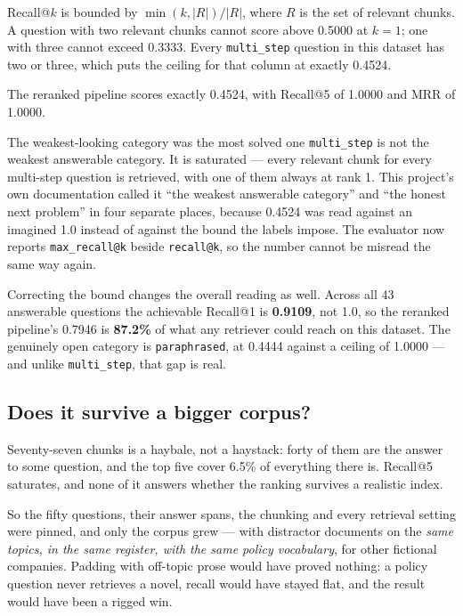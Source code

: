 \documentclass[11pt,a4paper]{article}
\newcommand{\code}[1]{\texttt{\small #1}}
\begin{document}
Recall@$k$ is bounded by $\min(k, |R|) / |R|$, where $R$ is the set of relevant
chunks. A question with two relevant chunks cannot score above 0.5000 at $k=1$;
one with three cannot exceed 0.3333. Every \code{multi\_step} question in this
dataset has two or three, which puts the ceiling for that column at exactly
0.4524.

The reranked pipeline scores exactly 0.4524, with Recall@5 of 1.0000 and MRR of
1.0000.

\begin{finding}{The weakest-looking category was the most solved one}
\code{multi\_step} is not the weakest answerable category. It is saturated ---
every relevant chunk for every multi-step question is retrieved, with one of them
always at rank 1. This project's own documentation called it ``the weakest
answerable category'' and ``the honest next problem'' in four separate places,
because 0.4524 was read against an imagined 1.0 instead of against the bound the
labels impose. The evaluator now reports \code{max\_recall@k} beside
\code{recall@k}, so the number cannot be misread the same way again.
\end{finding}

Correcting the bound changes the overall reading as well. Across all 43
answerable questions the achievable Recall@1 is \textbf{0.9109}, not 1.0, so the
reranked pipeline's 0.7946 is \textbf{87.2\%} of what any retriever could reach
on this dataset. The genuinely open category is \code{paraphrased}, at 0.4444
against a ceiling of 1.0000 --- and unlike \code{multi\_step}, that gap is real.

\subsection{Does it survive a bigger corpus?}
\label{sec:scale}

Seventy-seven chunks is a haybale, not a haystack: forty of them are the answer to
some question, and the top five cover 6.5\% of everything there is. Recall@5
saturates, and none of it answers whether the ranking survives a realistic index.

So the fifty questions, their answer spans, the chunking and every retrieval
setting were pinned, and only the corpus grew --- with distractor documents on the
\emph{same topics, in the same register, with the same policy vocabulary}, for
other fictional companies. Padding with off-topic prose would have proved
nothing: a policy question never retrieves a novel, recall would have stayed
flat, and the result would have been a rigged win.
\end{document}
